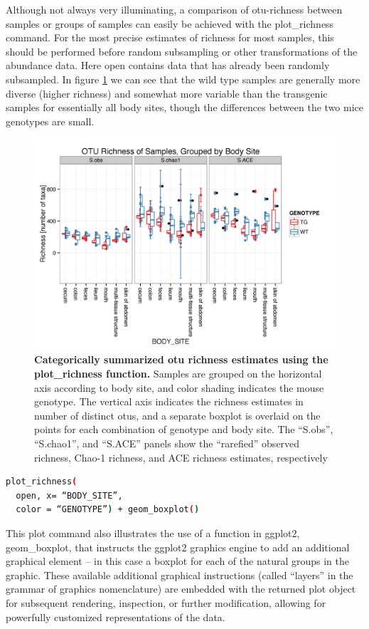 Although not always very illuminating, a comparison of \gls{otu}-richness between samples or groups of samples can
easily be achieved with the plot\_richness command. For the most precise estimates of richness for most samples,
this should be performed before random subsampling or other transformations of the abundance data. Here open
contains data that has already been randomly subsampled. In figure \ref{bfigure22} we can see that the wild type
samples are generally more diverse (higher richness) and somewhat more variable than the transgenic samples for
essentially all body sites, though the differences between the two mice genotypes are small.

\begin{figure}[htbp]
\includegraphics[width=0.75\columnwidth]{chapter_book_figures/Figure_22.jpg}
\caption[Categorically summarized \gls{otu} richness estimates using the plot\_richness function]{\textbf{Categorically summarized \gls{otu} richness estimates using the plot\_richness function.}
Samples are grouped on the horizontal axis according to body site, and color shading
indicates the mouse genotype. The vertical axis indicates the richness estimates in number
of distinct \gls{otu}s, and a separate boxplot is overlaid on the points for each combination
of genotype and body site. The “S.obs”, “S.chao1”, and “S.ACE” panels show the “rarefied”
observed richness, Chao-1 richness, and ACE richness estimates, respectively}
\label{bfigure22}
\end{figure}

\begin{lstlisting}[language=bash]
plot_richness(
  open, x= “BODY_SITE”,
  color = “GENOTYPE”) + geom_boxplot()
\end{lstlisting}

This plot command also illustrates the use of a function in ggplot2, geom\_boxplot,
that instructs the ggplot2 graphics engine to add an additional graphical element –
in this case a boxplot for each of the natural groups in the graphic. These available
additional graphical instructions (called “layers” in the grammar of graphics nomenclature)
are embedded with the returned plot object for subsequent rendering, inspection, or further
modification, allowing for powerfully customized representations of the data.

